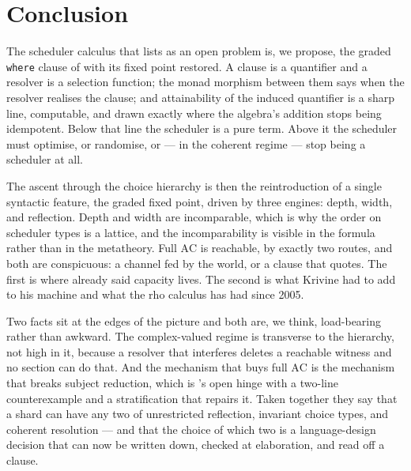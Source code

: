 \documentclass[11pt]{article}
\theoremstyle{definition}
\theoremstyle{plain}
\theoremstyle{remark}
\newcommand{\AC}{\mathrm{AC}}
\begin{document}
\section{Conclusion}\label{sec:conc}

The scheduler calculus that \cite{choicesched} lists as an open problem is, we propose,
the graded \texttt{where} clause of \cite{gradedwhere} with its fixed point restored. A
clause is a quantifier and a resolver is a selection function; the monad morphism
between them says when the resolver realises the clause; and attainability of the
induced quantifier is a sharp line, computable, and drawn exactly where the algebra's
addition stops being idempotent. Below that line the scheduler is a pure term. Above it
the scheduler must optimise, or randomise, or --- in the coherent regime --- stop being
a scheduler at all.

The ascent through the choice hierarchy is then the reintroduction of a single
syntactic feature, the graded fixed point, driven by three engines: depth, width, and
reflection. Depth and width are incomparable, which is why the order on scheduler types
is a lattice, and the incomparability is visible in the formula rather than in the
metatheory. Full $\AC$ is reachable, by exactly two routes, and both are conspicuous:
a channel fed by the world, or a clause that quotes. The first is where \cite{agency}
already said capacity lives. The second is what Krivine had to add to his machine and
what the rho calculus has had since 2005.

Two facts sit at the edges of the picture and both are, we think, load-bearing rather
than awkward. The complex-valued regime is transverse to the hierarchy, not high in it,
because a resolver that interferes deletes a reachable witness and no section can do
that. And the mechanism that buys full $\AC$ is the mechanism that breaks subject
reduction, which is \cite{agency}'s open hinge with a two-line counterexample and a
stratification that repairs it. Taken together they say that a shard can have any two
of unrestricted reflection, invariant choice types, and coherent resolution --- and
that the choice of which two is a language-design decision that can now be written
down, checked at elaboration, and read off a clause.
\end{document}
